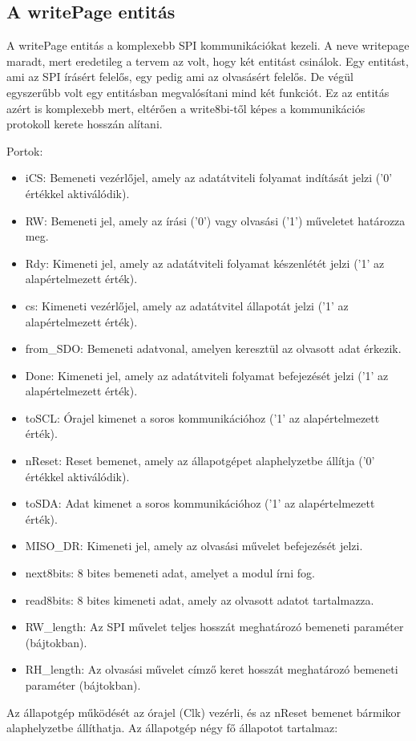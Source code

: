 \documentclass[a4paper,12pt,oneside]{book}
\begin{document}
\subsection{A writePage entitás}
A writePage entitás a komplexebb SPI kommunikációkat kezeli. A neve writepage maradt, mert eredetileg a tervem az volt, hogy két entitást csinálok. Egy entitást, ami az SPI írásért felelős, egy pedig ami az olvasásért felelős. De végül egyszerűbb volt egy entitásban megvalósítani mind két funkciót.
Ez az entitás azért is komplexebb mert, eltérően a write8bi-től képes a kommunikációs protokoll kerete hosszán alítani.

Portok:
\begin{itemize}
	\item iCS: Bemeneti vezérlőjel, amely az adatátviteli folyamat indítását jelzi ('0' értékkel aktiválódik).
	\item RW: Bemeneti jel, amely az írási ('0') vagy olvasási ('1') műveletet határozza meg.
	\item Rdy: Kimeneti jel, amely az adatátviteli folyamat készenlétét jelzi ('1' az alapértelmezett érték).
	\item cs: Kimeneti vezérlőjel, amely az adatátvitel állapotát jelzi ('1' az alapértelmezett érték).
	\item from\_SDO: Bemeneti adatvonal, amelyen keresztül az olvasott adat érkezik.
	\item Done: Kimeneti jel, amely az adatátviteli folyamat befejezését jelzi ('1' az alapértelmezett érték).
	\item toSCL: Órajel kimenet a soros kommunikációhoz ('1' az alapértelmezett érték).
	\item nReset: Reset bemenet, amely az állapotgépet alaphelyzetbe állítja ('0' értékkel aktiválódik).
	\item toSDA: Adat kimenet a soros kommunikációhoz ('1' az alapértelmezett érték).
	\item MISO\_DR: Kimeneti jel, amely az olvasási művelet befejezését jelzi.
	\item next8bits: 8 bites bemeneti adat, amelyet a modul írni fog.
	\item read8bits: 8 bites kimeneti adat, amely az olvasott adatot tartalmazza.
	\item RW\_length: Az SPI művelet teljes hosszát meghatározó bemeneti paraméter (bájtokban).
	\item RH\_length: Az olvasási művelet címző keret hosszát meghatározó bemeneti paraméter (bájtokban).
\end{itemize}
Az állapotgép működését az órajel (Clk) vezérli, és az nReset bemenet bármikor alaphelyzetbe állíthatja.
Az állapotgép négy fő állapotot tartalmaz:
\end{document}

